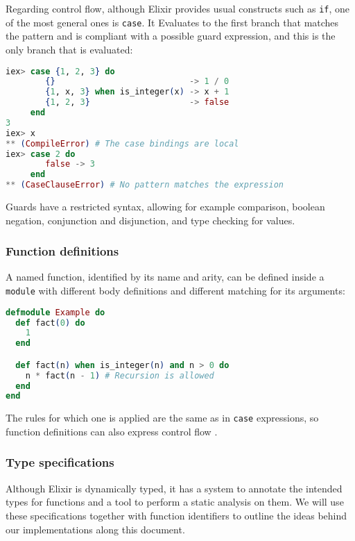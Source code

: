 Regarding control flow, although Elixir provides usual constructs such as 
\verb|if|, one of the most general ones is \verb|case|. It Evaluates to 
the first branch that matches the pattern and is compliant with a possible
guard expression, and this is the only branch that is evaluated:

\begin{lstlisting}[language=elixir,numbers=none,frame=none]
iex> case {1, 2, 3} do 
        {}                           -> 1 / 0
        {1, x, 3} when is_integer(x) -> x + 1
        {1, 2, 3}                    -> false
     end
3
iex> x
** (CompileError) # The case bindings are local
iex> case 2 do 
        false -> 3 
     end 
** (CaseClauseError) # No pattern matches the expression
\end{lstlisting}

Guards have a restricted syntax, allowing for example comparison, boolean 
negation, conjunction and disjunction, and type checking for values.

\subsubsection{Function definitions}

A named function, identified by its name and arity, can be defined inside 
a \verb|module| with different body definitions and different matching for
its arguments:

\begin{lstlisting}[language=elixir,numbers=none,frame=none]
defmodule Example do 
  def fact(0) do 
    1
  end

  def fact(n) when is_integer(n) and n > 0 do 
    n * fact(n - 1) # Recursion is allowed
  end
end
\end{lstlisting}

The rules for which one is applied are the same as in \verb|case| expressions,
so function definitions can also express control flow \citep{programmingElixir}.

\subsubsection{Type specifications}
\label{prelim:typespecs}

Although Elixir is dynamically typed, it has a system to annotate the intended
types for functions and a tool to perform a static analysis on them. We will
use these specifications together with function identifiers to outline the ideas
behind our implementations along this document.


